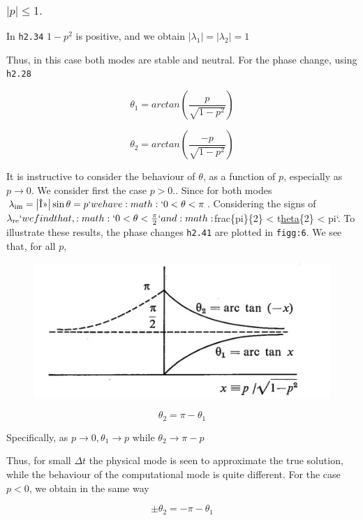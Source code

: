 \subsubsection{\(\left| p \right| \leq 1.\)}\label{subsubsec:p-smaller-1.}

In \texttt{h2.34} \(1 - p^{2}\) is positive, and we obtain
\(\left| \lambda_{1} \right| = \left| \lambda_{2} \right| = 1\)

Thus, in this case both modes are stable and neutral. For the phase
change, using \texttt{h2.28}

\[\theta_{1} = arctan\left( \frac{p}{\sqrt{1 - p^{2}}} \right)\]

\[\theta_{2} = arctan\left( \frac{- p}{\sqrt{1 - p^{2}}} \right)\]

It is instructive to consider the behaviour of \(\theta\), as a function
of \(p\), especially as \(p \rightarrow 0.\) We consider first the case
\(p > 0.\). Since for both modes
\(\lambda_{\text{im}} = \left| \text{Î»} \right|\sin{\theta = p}`we
have :math:`0 < \theta < \pi\). Considering the signs of
\(\lambda_{\text{re}}`we find that,
:math:`0 < \theta < \frac{\pi}{2}`and
:math:\)frac\{pi\}\{2\} \textless{} t\href{}{heta}\{2\} \textless{} pi`.
To illustrate these results, the phase changes \texttt{h2.41} are
plotted in \texttt{figg:6}. We see that, for all \(p\),

\begin{figure}
    \centering
    \includegraphics[width = .7 \textwidth]{figs/NM/pic6.jpg}
    \caption{} \label{fig:}
\end{figure}

\[\theta_{2} = \pi - \theta_{1}\]

Specifically, as \(p \rightarrow 0, \theta_{1} \rightarrow p\) while
\(\theta_{2} \rightarrow \pi - p\)

Thus, for small \(\Delta t\) the physical mode is seen to approximate
the true solution, while the behaviour of the computational mode is
quite different. For the case \(p < 0\), we obtain in the same way

\[\pm \theta_{2} = - \pi - \theta_{1}\]

